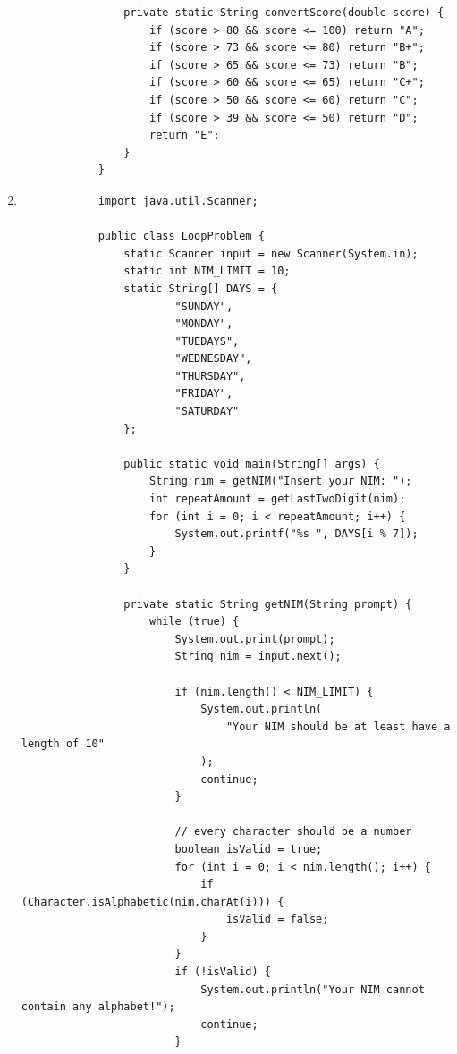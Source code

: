 \documentclass[12pt,titlepage]{article}
\begin{document}
\begin{enumerate}
{\begin{verbatim}
                private static String convertScore(double score) {
                    if (score > 80 && score <= 100) return "A";
                    if (score > 73 && score <= 80) return "B+";
                    if (score > 65 && score <= 73) return "B";
                    if (score > 60 && score <= 65) return "C+";
                    if (score > 50 && score <= 60) return "C";
                    if (score > 39 && score <= 50) return "D";
                    return "E";
                }
            }
        \end{verbatim}
    }
    \item {
        \begin{verbatim}
            import java.util.Scanner;

            public class LoopProblem {
                static Scanner input = new Scanner(System.in);
                static int NIM_LIMIT = 10;
                static String[] DAYS = {
                        "SUNDAY",
                        "MONDAY",
                        "TUEDAYS",
                        "WEDNESDAY",
                        "THURSDAY",
                        "FRIDAY",
                        "SATURDAY"
                };

                public static void main(String[] args) {
                    String nim = getNIM("Insert your NIM: ");
                    int repeatAmount = getLastTwoDigit(nim);
                    for (int i = 0; i < repeatAmount; i++) {
                        System.out.printf("%s ", DAYS[i % 7]);
                    }
                }

                private static String getNIM(String prompt) {
                    while (true) {
                        System.out.print(prompt);
                        String nim = input.next();

                        if (nim.length() < NIM_LIMIT) {
                            System.out.println(
                                "Your NIM should be at least have a length of 10"
                            );
                            continue;
                        }

                        // every character should be a number
                        boolean isValid = true;
                        for (int i = 0; i < nim.length(); i++) {
                            if (Character.isAlphabetic(nim.charAt(i))) {
                                isValid = false;
                            }
                        }
                        if (!isValid) {
                            System.out.println("Your NIM cannot contain any alphabet!");
                            continue;
                        }


\end{verbatim}}
\end{enumerate}
\end{document}
